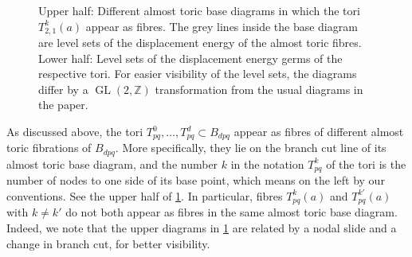 \documentclass[AIF,Unicode,manuscript]{cedram}
\DeclareMathOperator{\GL}{GL}
\begin{document}
\begin{figure}
    \centering
    \caption{Upper half: Different almost toric base diagrams in which the tori $T^k_{2,1}(a)$ appear as fibres. The grey lines inside the base diagram are level sets of the displacement energy of the almost toric fibres. Lower half: Level sets of the displacement energy germs of the respective tori. 
    For easier visibility of the  level sets, the diagrams differ by a $\GL(2,ℤ)$ transformation from the usual diagrams in the paper.}
    \label{fig:germ_examples}
\end{figure}

As discussed above, the tori $T^0_{pq}, \ldots , T^d_{pq} \subset B_{dpq}$ appear as fibres of different almost toric fibrations of $B_{dpq}$.
More specifically, they lie on the branch cut line of its almost toric base diagram, and the number $k$ in the notation $T^k_{pq}$ of the tori is the number of nodes to one side of its base point, which means on the left by our conventions. See the upper half of \cref{fig:germ_examples}.
In particular, fibres $T^k_{pq}(a)$ and $T^{k'}_{pq}(a)$ with $k \neq k'$ do not both appear as fibres in the same almost toric base diagram.
Indeed, we note that the upper diagrams in \cref{fig:germ_examples} are related by a nodal slide and a change in branch cut, for better visibility.
\end{document}
